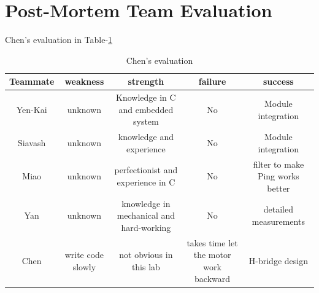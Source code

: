 \documentclass[a4paper]{article}
\begin{document}
\section{Post-Mortem Team Evaluation}
Chen's evaluation in Table-\ref{tab5}
\begin{table}
\center
\tiny
  \begin{tabular}{|c|c|c|c|c|}
    \hline
    Teammate & weakness & strength & failure & success\\
    \hline
	Yen-Kai & unknown & Knowledge in C and embedded system & No & Module integration\\
	Siavash & unknown & knowledge and experience & No & Module integration\\
	Miao	& unknown & perfectionist and experience in C & No & filter to make Ping works better\\
	Yan		& unknown & knowledge in mechanical and hard-working & No & detailed measurements\\
	Chen	& write code slowly & not obvious in this lab & takes time let the motor work backward & H-bridge design\\
    \hline
  \end{tabular}
  \caption{Chen's evaluation}
  \label{tab5}
\end{table}
\end{document}
